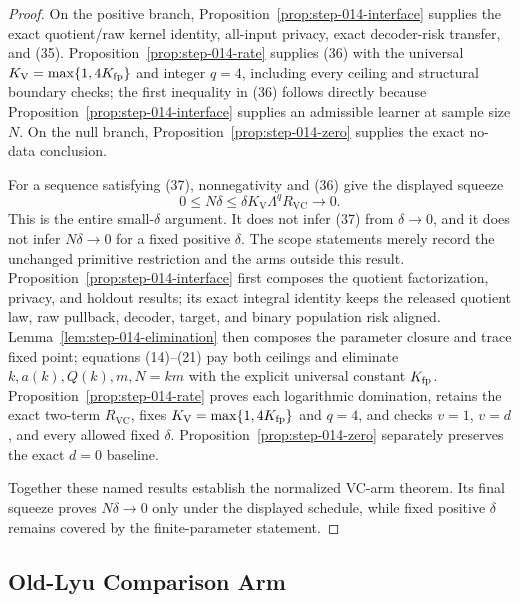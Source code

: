 \begin{proof}
On the positive branch,
Proposition~\ref{prop:step-014-interface} supplies the exact quotient/raw
kernel identity, all-input privacy, exact decoder-risk transfer, and (35).
Proposition~\ref{prop:step-014-rate} supplies (36) with the universal
\(K_{\mathrm V}=\max\{1,4K_{\rm fp}\}\) and integer \(q=4\), including every ceiling
and structural boundary checks; the first inequality in (36) follows
directly because Proposition~\ref{prop:step-014-interface} supplies an
admissible learner at sample size \(N\). On the null branch,
Proposition~\ref{prop:step-014-zero} supplies the exact no-data conclusion.

For a sequence satisfying (37), nonnegativity and (36) give the displayed
squeeze
\[
 0\leq N\delta
 \leq\delta K_{\mathrm V}\Lambda^qR_{\mathrm{VC}}
 \longrightarrow0.
\tag{38}
\]
This is the entire small-\(\delta\) argument. It does not infer (37) from
\(\delta\to0\), and it does not infer \(N\delta\to0\) for a fixed positive
\(\delta\). The scope statements merely record the unchanged primitive
restriction and the arms outside this result. 
Proposition~\ref{prop:step-014-interface} first composes the quotient
factorization, privacy, and holdout results; its exact integral identity keeps
the released quotient law, raw pullback, decoder, target, and binary
population risk aligned. Lemma~\ref{lem:step-014-elimination} then composes
the parameter closure and trace fixed point; equations (14)--(21) pay both ceilings
and eliminate \(k,a(k),Q(k),m,N=km\) with the explicit universal constant
\(K_{\rm fp}\). Proposition~\ref{prop:step-014-rate} proves each logarithmic
domination, retains the exact two-term \(R_{\mathrm{VC}}\), fixes
\(K_{\mathrm V}=\max\{1,4K_{\rm fp}\}\) and \(q=4\), and checks \(v=1\), \(v=d\), and
every allowed fixed \(\delta\). Proposition~\ref{prop:step-014-zero}
separately preserves the exact \(d=0\) baseline.

Together these named results establish the normalized VC-arm theorem. Its
final squeeze proves \(N\delta\to0\) only
under the displayed schedule, while fixed positive \(\delta\) remains covered
by the finite-parameter statement.



\end{proof}

\subsection{Old-Lyu Comparison Arm}\label{app:step_015}


